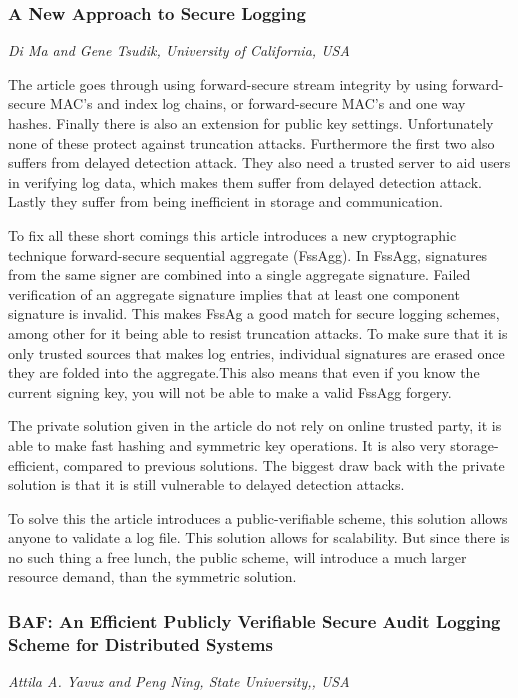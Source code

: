 \subsubsection{A New Approach to Secure Logging}
\vspace{-3mm}
{\footnotesize \it Di Ma and Gene Tsudik, University of California, USA}~\cite{ma}

The article goes through using forward-secure stream integrity by
using forward-secure MAC's and index log chains, or forward-secure
MAC's and one way hashes. Finally there is also an extension for
public key settings. Unfortunately none of these protect against
truncation attacks. Furthermore the first two also suffers from
delayed detection attack. They also need a trusted server to aid users
in verifying log data, which makes them suffer from delayed detection
attack. Lastly they suffer from being inefficient in storage and
communication.

To fix all these short comings this article introduces a new
cryptographic technique forward-secure sequential aggregate
(FssAgg). In FssAgg, signatures from the same signer are combined into
a single aggregate signature. Failed verification of an aggregate
signature implies that at least one component signature is
invalid. This makes FssAg a good match for secure logging schemes,
among other for it being able to resist truncation attacks. To make
sure that it is only trusted sources that makes log entries,
individual signatures are erased once they are folded into the
aggregate.This also means that even if you know the current signing
key, you will not be able to make a valid FssAgg forgery.

The private solution given in the article do not rely on online
trusted party, it is able to make fast hashing and symmetric key
operations. It is also very storage-efficient, compared to previous
solutions. The biggest draw back with the private solution is that it
is still vulnerable to delayed detection attacks.

To solve this the article introduces a public-verifiable scheme, this
solution allows anyone to validate a log file. This solution allows
for scalability. But since there is no such thing a free lunch, the
public scheme, will introduce a much larger resource demand, than the
symmetric solution.~\cite{ma}


\subsubsection{BAF: An Efficient Publicly Verifiable Secure Audit Logging Scheme for Distributed Systems}
\vspace{-3mm}
{\footnotesize \it Attila A. Yavuz and Peng Ning, State University,, USA}~\cite{baf}

